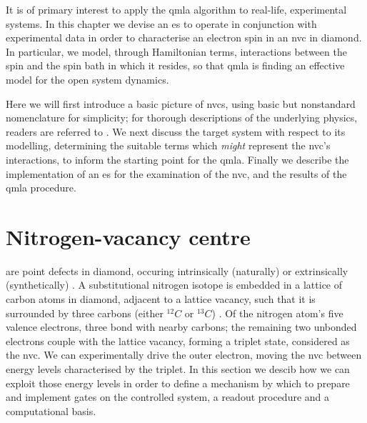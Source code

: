 \glsresetall
It is of primary interest to apply the \gls{qmla} algorithm to real-life, experimental systems. 
In this chapter we devise an \gls{es} to operate in conjunction with experimental data 
    in order to characterise an electron spin in an \gls{nvc} in diamond.
In particular, we model, through Hamiltonian terms, interactions between the spin and 
    the spin bath in which it resides,
    so that \gls{qmla} is finding an effective model for the open system dynamics.
\par

Here we will first introduce a basic picture of \glspl{nvc}, 
    using basic but nonstandard nomenclature for simplicity;
    for thorough descriptions of the underlying physics, readers are referred to \cite{doherty2013nitrogen}.
We next discuss the target system with respect to its modelling, 
    determining the suitable terms which \emph{might} represent the \gls{nvc}'s interactions, 
    to inform the starting point for the \gls{qmla}.
Finally we describe the implementation of an \gls{es} for the examination of the \gls{nvc},
    and the results of the \gls{qmla} procedure. 

\section{Nitrogen-vacancy centre}
\label{sec:nv_centres}

 are point defects in diamond, 
    occuring intrinsically (naturally) \cite{davies1976optical} or extrinsically (synthetically) \cite{meijer2005generation, edmonds2012production}.
A substitutional \gls{nitrogen} isotope is embedded in a lattice of carbon atoms in diamond, 
    adjacent to a lattice vacancy, 
    such that it is surrounded by three \glspl{carbon} (either $^{12}C$ or $^{13}C$) \cite{lenef1996electronic}. 
Of the \gls{nitrogen} atom's five valence electrons, three bond with nearby \glspl{carbon};
    the remaining two unbonded electrons couple with the lattice vacancy, 
    forming a triplet state, considered as the \gls{nvc}. 
We can experimentally drive the outer electron, moving the \gls{nvc} between energy levels characterised by the triplet. 
In this section we descib how we can exploit those energy levels in order to define a mechanism by which to 
    prepare and implement gates on the controlled system, a readout procedure and a computational basis.

\par 

